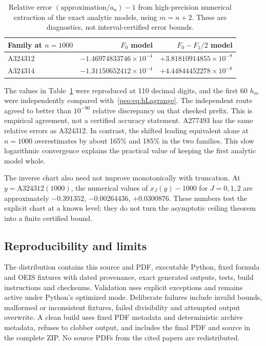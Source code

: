 \documentclass[11pt]{article}
\numberwithin{equation}{section}
\theoremstyle{remark}\newtheorem{remark}[theorem]{Remark}
\begin{document}
\begin{table}[ht]
\centering\small
\begin{tabular}{@{}lrr@{}}\toprule
Family at $n=1000$ & $F_0$ model & $F_0-F_1/2$ model\\\midrule
A324312 & $-1.46974833746\times10^{-4}$ & $+3.81810914855\times10^{-8}$\\
A324314 & $-1.31150652412\times10^{-4}$ & $+4.44844452278\times10^{-8}$\\\bottomrule
\end{tabular}
\caption{Relative error $(\text{approximation}/a_n)-1$ from high-precision numerical extraction of the exact analytic models, using $m=n+2$. These are diagnostics, not interval-certified error bounds.}\label{peo:tab:diagnostics}
\end{table}
The values in Table~\ref{peo:tab:diagnostics} were reproduced at 110 decimal digits, and the first 60 $h_m$ were independently compared with~\eqref{peo:eq:hLagrange}. The independent route agreed to better than $10^{-90}$ relative discrepancy on that checked prefix. This is empirical agreement, not a certified accuracy statement. A277493 has the same relative errors as A324312. In contrast, the shifted leading equivalent alone at $n=1000$ overestimates by about 165\% and 185\% in the two families. This slow logarithmic convergence explains the practical value of keeping the first analytic model whole.

The inverse chart also need not improve monotonically with truncation. At $y=\mathrm{A324312}(1000)$, the numerical values of $x_J(y)-1000$ for $J=0,1,2$ are approximately $-0.391352$, $-0.00264436$, $+0.0300876$. These numbers test the explicit chart at a known level; they do not turn the asymptotic ceiling theorem into a finite certified bound.

\subsection{Reproducibility and limits}
The distribution contains this source and PDF, executable Python, fixed formula and OEIS fixtures with dated provenance, exact generated outputs, tests, build instructions and checksums. Validation uses explicit exceptions and remains active under Python's optimized mode. Deliberate failures include invalid bounds, malformed or inconsistent fixtures, failed divisibility and attempted output overwrite. A clean build uses fixed PDF metadata and deterministic archive metadata, refuses to clobber output, and includes the final PDF and source in the complete ZIP. No source PDFs from the cited papers are redistributed.
\end{document}
